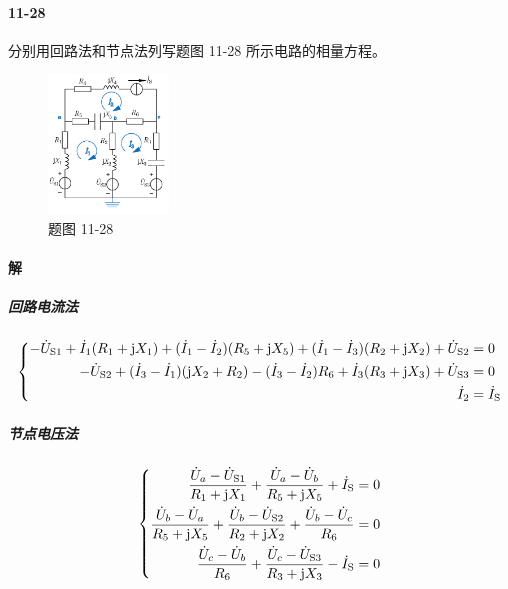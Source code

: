 \documentclass[hyperref, UTF8]{ctexart}
\newcommand{\source}{{\rm S}}
\newcommand{\J}{{\rm j}}
\begin{document}
\paragraph{11-28}\label{11-28}
分别用回路法和节点法列写题图 11-28 所示电路的相量方程。

\begin{figure}[!htb]
\centering
\includegraphics[width=0.285\textwidth]{p11-28.png}
\caption*{题图 11-28}
\end{figure}

\paragraph{解}

\subparagraph{回路电流法}
\begin{align*}
\left\{ \begin{aligned}
 - \dot U _{\source 1}+ \dot I _1(R_1+ \J X_1)+( \dot I _1- \dot I _2)(R_5+ \J X_5) + ( \dot I _1- \dot I _3)(R_2+ \J X_2) + \dot U _{\source 2} & = 0 \\
 - \dot U _{\source 2}+( \dot I _3- \dot I _1)( \J X_2+R_2)-( \dot I _3- \dot I _2)R_6+ \dot I _3(R_3+ \J X_3)+ \dot U _{\source 3} & = 0 \\
 \dot I _2 & = \dot I _\source
\end{aligned} \right.
\end{align*}

\subparagraph{节点电压法}
\begin{align*} \left\{ \begin{aligned}
 \frac{ \dot U _a - \dot U _{\source 1}}{R_1 + \J X_1} + \frac{ \dot U _a - \dot U _b}{R_5 + \J X_5} + \dot I _\source & = 0 \\
 \frac{ \dot U _b- \dot U _a}{R_5+ \J X_5} + \frac{ \dot U _b - \dot U _{\source 2}}{R_2 + \J X_2} + \frac{ \dot U _b - \dot U _c}{R_6} & = 0 \\
 \frac{ \dot U _c - \dot U _b}{R_6} + \frac{ \dot U _c - \dot U _{\source 3}} {R_3 + \J X_3} - \dot I _\source & = 0
\end{aligned} \right. \end{align*}
\end{document}
